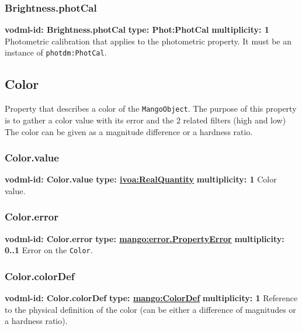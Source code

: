     \subsubsection{Brightness.photCal}
    \textbf{vodml-id: Brightness.photCal} \newline
    \textbf{type: Phot:PhotCal} \newline
    \textbf{multiplicity: 1} \newline
    Photometric calibration that applies to the photometric property. It must be an instance of \texttt{photdm:PhotCal}.

  \subsection{Color}
    \label{sect:Color}
    Property that describes a color of the \texttt{MangoObject}. The purpose of this property is to gather a color value with its error and the 2 related filters (high and low) The color can be given as a magnitude difference or a hardness ratio.

    \subsubsection{Color.value}
    \textbf{vodml-id: Color.value} \newline
    \textbf{type: \hyperref[sect:ivoa]{ivoa:RealQuantity}} \newline
    \textbf{multiplicity: 1} \newline
    Color value.

    \subsubsection{Color.error}
    \textbf{vodml-id: Color.error} \newline
    \textbf{type: \hyperref[sect:error.PropertyError]{mango:error.PropertyError}} \newline
    \textbf{multiplicity: 0..1} \newline
    Error on the \texttt{Color}.

    \subsubsection{Color.colorDef}
    \textbf{vodml-id: Color.colorDef} \newline
    \textbf{type: \hyperref[sect:ColorDef]{mango:ColorDef}} \newline
    \textbf{multiplicity: 1} \newline
    Reference to the physical definition of the color (can be either a difference of magnitudes or a hardness ratio).

